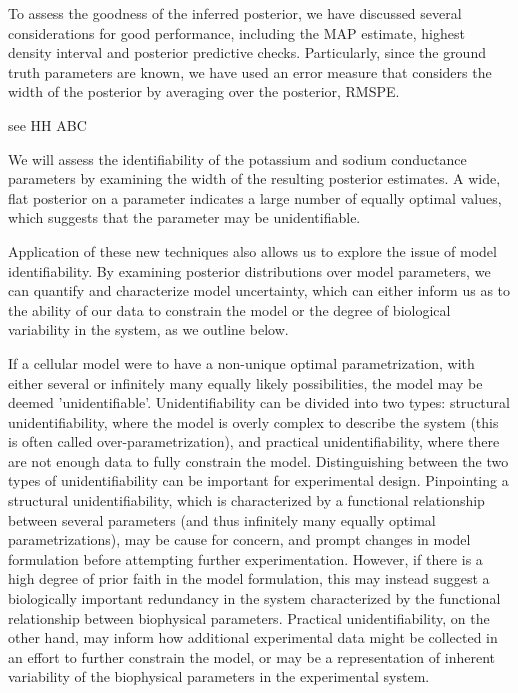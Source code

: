 To assess the goodness of the inferred posterior, we have discussed several considerations for good performance, including the MAP estimate, highest density interval and posterior predictive checks. Particularly, since the ground truth parameters are known, we have used an error measure that considers the width of the posterior by averaging over the posterior, RMSPE.

see HH ABC 

We will assess the identifiability of the potassium and sodium conductance parameters by examining the width of the resulting posterior estimates. A wide, flat posterior on a parameter indicates a large number of equally optimal values, which suggests that the parameter may be unidentifiable.

Application of these new techniques also allows us to explore the issue of model identifiability. By examining posterior distributions over model parameters, we can quantify and characterize model uncertainty, which can either inform us as to the ability of our data to constrain the model or the degree of biological variability in the system, as we outline below.

If a cellular model were to have a non-unique optimal parametrization, with either several or infinitely many equally likely possibilities, the model may be deemed 'unidentifiable'. Unidentifiability can be divided into two types: structural unidentifiability, where the model is overly complex to describe the system (this is often called over-parametrization), and practical unidentifiability, where there are not enough data to fully constrain the model. Distinguishing between the two types of unidentifiability can be important for experimental design. Pinpointing a structural  unidentifiability, which is characterized by a functional relationship between several parameters (and thus infinitely many equally optimal parametrizations), may be cause for concern, and prompt changes in model formulation before attempting further experimentation. However, if there is a high degree of prior faith in the model formulation, this may instead suggest a biologically important redundancy in the system characterized by the functional relationship between biophysical parameters. Practical unidentifiability, on the other hand, may inform how additional experimental data might be collected in an effort to further constrain the model, or may be a representation of inherent variability of the biophysical parameters in the experimental system. 

